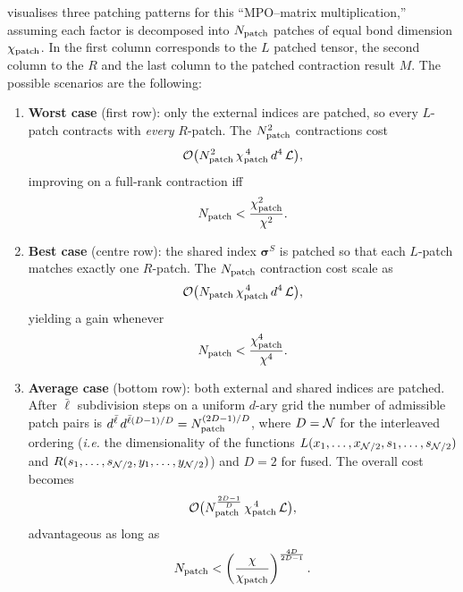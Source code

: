  visualises three patching patterns for this “MPO–matrix multiplication,” assuming each factor is decomposed into \(N_{\text{patch}}\) patches of equal bond dimension \(\chi_{\text{patch}}\). In  the first column corresponds to the $L$ patched tensor, the second column to the $R$ and the last column to the patched contraction result $M$. The possible scenarios are the following:

\begingroup
\renewcommand{\labelenumi}{(\alph{enumi})}
\begin{enumerate}
\item \textbf{Worst case} (first row):  
      only the external indices are patched, so every \(L\)-patch contracts
      with \emph{every} \(R\)-patch.  
      The \(N_{\text{patch}}^{2}\) contractions cost
      \begin{equation}
        \label{eq:worsScaling}
        \mathcal{O}\bigl(
           N_{\text{patch}}^{2}\,
           \chi_{\text{patch}}^{\,4}\,d^{4}\,\mathcal L
        \bigr),
      \end{equation}
      improving on a full-rank contraction iff
      \begin{equation}
       N_{\text{patch}}<\frac{\chi_{\text{patch}}^{2}}{\chi^{2}}.
       \label{eq:worstBound}
      \end{equation}
      

\item \textbf{Best case} (centre row):  
      the shared index \(\boldsymbol{\sigma}^{S}\) is patched so that each
      \(L\)-patch matches exactly one \(R\)-patch.  
      The \(N_{\text{patch}} \) contraction cost scale as
      \begin{equation}
        \mathcal{O}\bigl(
          N_{\text{patch}} \,
          \chi_{\text{patch}}^{\,4}\,d^{4}\,\mathcal L
        \bigr),
      \end{equation}
      yielding a gain whenever
      \begin{equation}
       N_{\text{patch}}<\frac{\chi_{\text{patch}}^{4}}{\chi^{4}}.
       \label{eq:bestBound}
      \end{equation}

\item \textbf{Average case} (bottom row):  
      both external and shared indices are patched.  
      After \(\bar\ell\) subdivision steps on a uniform \(d\)-ary grid the
      number of admissible patch pairs is
      \(d^{\bar\ell}\,d^{\bar\ell( D-1)/D}
       =N_{\text{patch}}^{(2D-1)/D}\), where $D=\mathcal{N}$ for the interleaved ordering (\textit{i.e.} the dimensionality of the functions $L(x_1,\dots,x_{\mathcal{N}/2},s_1,\dots,s_{\mathcal{N}/2})$ and $R(s_1,\dots,s_{\mathcal{N}/2},y_1,\dots,y_{\mathcal{N}/2})$) and \(D=2\) for fused.
      The overall cost becomes
      \begin{equation}
        \mathcal{O}\bigl(
          N_{\text{patch}}^{\frac{2D-1}{D}}\,
          \chi_{\text{patch}}^{\,4}\,\mathcal L
        \bigr),
      \end{equation}
      advantageous as long as
      \begin{equation}
        N_{\text{patch}}<\left(\frac{\chi}{\chi_{\text{patch}}}\right)^{\frac{4D}{2D-1}}.
        \label{eq:averageBound}
      \end{equation}
\end{enumerate}
\endgroup

